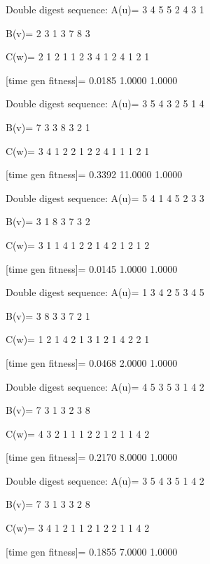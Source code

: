 Double digest sequence:
A(u)=
     3     4     5     5     2     4     3     1

B(v)=
     2     3     1     3     7     8     3

C(w)=
     2     1     2     1     1     2     3     4     1     2     4     1     2     1

[time gen fitness]=
    0.0185    1.0000    1.0000

Double digest sequence:
A(u)=
     3     5     4     3     2     5     1     4

B(v)=
     7     3     3     8     3     2     1

C(w)=
     3     4     1     2     2     1     2     2     4     1     1     1     2     1

[time gen fitness]=
    0.3392   11.0000    1.0000

Double digest sequence:
A(u)=
     5     4     1     4     5     2     3     3

B(v)=
     3     1     8     3     7     3     2

C(w)=
     3     1     1     4     1     2     2     1     4     2     1     2     1     2

[time gen fitness]=
    0.0145    1.0000    1.0000

Double digest sequence:
A(u)=
     1     3     4     2     5     3     4     5

B(v)=
     3     8     3     3     7     2     1

C(w)=
     1     2     1     4     2     1     3     1     2     1     4     2     2     1

[time gen fitness]=
    0.0468    2.0000    1.0000

Double digest sequence:
A(u)=
     4     5     3     5     3     1     4     2

B(v)=
     7     3     1     3     2     3     8

C(w)=
     4     3     2     1     1     1     2     2     1     2     1     1     4     2

[time gen fitness]=
    0.2170    8.0000    1.0000

Double digest sequence:
A(u)=
     3     5     4     3     5     1     4     2

B(v)=
     7     3     1     3     3     2     8

C(w)=
     3     4     1     2     1     1     2     1     2     2     1     1     4     2

[time gen fitness]=
    0.1855    7.0000    1.0000

